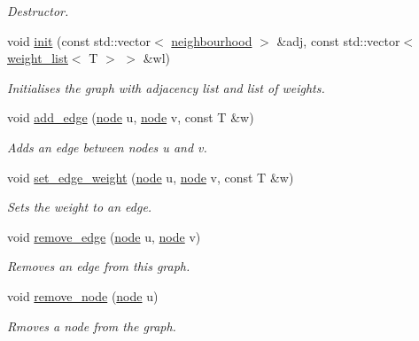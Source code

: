 \begin{DoxyCompactItemize}
\begin{DoxyCompactList}\small\item\em Destructor. \end{DoxyCompactList}\item 
void \hyperlink{classlgraph_1_1wdgraph_a0c3bbc5f54169acb294c636836c83047}{init} (const std\-::vector$<$ \hyperlink{namespacelgraph_a052e7766c13f3a43cec0aec8173fdede}{neighbourhood} $>$ \&adj, const std\-::vector$<$ \hyperlink{namespacelgraph_a1e0fd5ef0a78b2a92da48adbed265cb6}{weight\-\_\-list}$<$ T $>$ $>$ \&wl)
\begin{DoxyCompactList}\small\item\em Initialises the graph with adjacency list and list of weights. \end{DoxyCompactList}\item 
void \hyperlink{classlgraph_1_1wdgraph_a2aa52ff1c25ad06a10e243dcb74ce9a2}{add\-\_\-edge} (\hyperlink{namespacelgraph_a397169dd66adf725210a30fb7251773e}{node} u, \hyperlink{namespacelgraph_a397169dd66adf725210a30fb7251773e}{node} v, const T \&w)
\begin{DoxyCompactList}\small\item\em Adds an edge between nodes {\itshape u} and {\itshape v}. \end{DoxyCompactList}\item 
void \hyperlink{classlgraph_1_1wdgraph_a4bc95cc58a1f0d735c1317611f516969}{set\-\_\-edge\-\_\-weight} (\hyperlink{namespacelgraph_a397169dd66adf725210a30fb7251773e}{node} u, \hyperlink{namespacelgraph_a397169dd66adf725210a30fb7251773e}{node} v, const T \&w)
\begin{DoxyCompactList}\small\item\em Sets the weight to an edge. \end{DoxyCompactList}\item 
void \hyperlink{classlgraph_1_1wdgraph_a6bdc75a07568928bc179dde03a814366}{remove\-\_\-edge} (\hyperlink{namespacelgraph_a397169dd66adf725210a30fb7251773e}{node} u, \hyperlink{namespacelgraph_a397169dd66adf725210a30fb7251773e}{node} v)
\begin{DoxyCompactList}\small\item\em Removes an edge from this graph. \end{DoxyCompactList}\item 
void \hyperlink{classlgraph_1_1wdgraph_aa6861b63fccd1def268f3ff84d31da52}{remove\-\_\-node} (\hyperlink{namespacelgraph_a397169dd66adf725210a30fb7251773e}{node} u)
\begin{DoxyCompactList}\small\item\em Rmoves a node from the graph. \end{DoxyCompactList}\item 

\end{DoxyCompactItemize}
